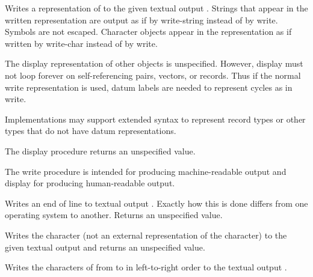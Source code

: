 \begin{entry}{
}

Writes a representation of  to the given textual output .
Strings that appear in the written representation are output as if by
{\cf write-string} instead of by {\cf write}.
Symbols are not escaped.  Character
objects appear in the representation as if written by {\cf write-char}
instead of by {\cf write}.

The {\cf display} representation of other objects is unspecified.
However, {\cf display} must not loop forever on
self-referencing pairs, vectors, or records.  Thus if the
normal {\cf write} representation is used, datum labels are needed
to represent cycles as in {\cf write}.

Implementations may support extended syntax to represent record types or
other types that do not have datum representations.

The {\cf display} procedure returns an unspecified value.

\begin{rationale}
The {\cf write} procedure is intended
for producing mach\-ine-readable output and {\cf display} for producing
human-readable output.
\end{rationale}
\end{entry}


\begin{entry}{
}

Writes an end of line to textual output .  Exactly how this
is done differs
from one operating system to another.  Returns an unspecified value.

\end{entry}


\begin{entry}{
}

Writes the character  (not an external representation of the
character) to the given textual output  and returns an unspecified
value.

\end{entry}

\begin{entry}{
}

Writes the characters of 
from  to 
in left-to-right order to the
textual output .

\end{entry}

